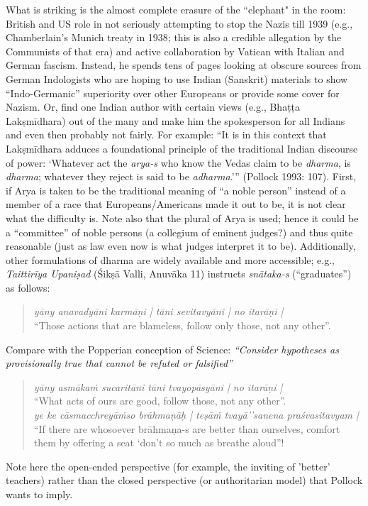 {\begin{enumerate}
What is striking is the almost complete erasure of the ``elephant" in the room: British and US role in not seriously attempting to stop the Nazis till 1939 (e.g., Chamberlain’s Munich treaty in 1938; this is also a credible allegation by the Communists of that era) and active collaboration by Vatican with Italian and German fascism. Instead, he spends tens of pages looking at obscure sources from German Indologists who are hoping to use Indian (Sanskrit) materials to show “Indo-Germanic” superiority over other Europeans or provide some cover for Nazism. Or, find one Indian author with certain views (e.g., Bhaṭṭa Lakṣmīdhara) out of the many and make him the spokesperson for all Indians and even then probably not fairly. For example: “It is in this context that Lakṣmīdhara adduces a foundational principle of the traditional Indian discourse of power: ‘Whatever act the {\sl arya-s} who know the Vedas claim to be {\sl dharma}, is {\sl dharma}; whatever they reject is said to be {\sl adharma}.’” (Pollock 1993: 107). First, if Arya is taken to be the traditional meaning of “a noble person” instead of a member of a race that Europeans/Americans made it out to be, it is not clear what the difficulty is. Note also that the plural of Arya is used; hence it could be a “committee” of noble persons (a collegium of eminent judges?) and thus quite reasonable (just as law even now is what judges interpret it to be). Additionally, other formulations of dharma are widely available and more accessible; e.g., {\sl Taittirīya Upaniṣad} (Śikṣā Valli, Anuvāka 11) instructs {\sl snātaka-s} (“graduates”) as follows:
\begin{quote}
{\sl yāny anavadyāni karmāṇi | tāni sevitavyāni | no itarāṇi |}\\
{\rm “Those actions that are blameless, follow only those, not any other”.}
\end{quote}
Compare with the Popperian conception of Science: {\sl “Consider hypotheses as provisionally true that cannot be refuted or falsified”}
\begin{quote}
{\sl yāny asmākaṁ sucaritāni tāni tvayopāsyāni | no itarāṇi |}\\
“What acts of ours are good, follow those, not any other”.\\[2pt]
{\sl ye ke cāsmacchreyāṁso brāhmaṇāḥ | teṣāṁ tvayā’’sanena praśvasitavyam |}\\
“If there are whosoever brāhmaṇa-s are better than ourselves, comfort them by offering a seat `don't so much as breathe aloud”!
\end{quote}
Note here the open-ended perspective (for example, the inviting of 'better' teachers) rather than the closed perspective (or authoritarian model) that Pollock wants to imply.
\end{enumerate}}

